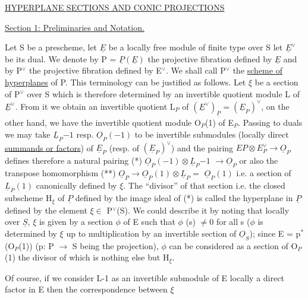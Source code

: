 \documentclass[11pt]{article}
\newcommand{\scanpage}[1]{\par\bigskip\noindent{\small\sffamily[scan #1]}\par}
\newcommand{\mspage}[1]{{\small\sffamily[p.\,#1]}}
\newcommand{\uline}[1]{\underline{#1}}
\begin{document}
\uline{HYPERPLANE SECTIONS AND CONIC PROJECTIONS}

\uline{Section 1: Preliminaries and Notation.}

Let S be a prescheme, let $\underline{E}$ be a locally free module of
finite type over S let $\underline{E}^{\vee}$ be its dual. We denote by P = $\underline{P}(\underline{E})$ the
projective fibration defined by $\underline{E}$ and by P$^{\vee}$ the projective
fibration defined by E$^{\vee}$. We shall call P$^{\vee}$ the \uline{scheme of}
\uline{hyperplanes} of P. This terminology can be justified as follows.
Let $\xi$ be a section of P$^{\vee}$ over S which is therefore determined by an
invertible quotient module L of $\underline{E}^{\vee}$. From it we obtain an
invertible quotient L$_{P}$ of $(\underline{E}^{\vee})_{\underline{P}} = (\underline{E}_{P})^{\vee}$, on the other hand, we have
the invertible quotient module O$_{P}$(1) of E$_{P}$. Passing to duals we
may take $\underline{L}_{P}{-1}$ resp. $\underline{O}_{P}(-1)$ to be invertible submodules (locally
direct \uline{summands or factors}) of $\underline{E}_{P}$ (resp. of $(\underline{E}_{P})^{\vee}$) and the pairing
$EP \otimes E^{\vee}_{P} \to \underline{O}_{P}$ defines therefore a natural pairing (*) $\underline{O}_{P}(-1) \otimes \underline{L}_{P}{-1}$
$\to \underline{O}_{P}$ or also the transpose homomorphism (**) $\underline{O}_{P} \to \underline{O}_{P}(1) \otimes \underline{L}_{P} =$
$\underline{O}_{P}(1)$ i.e. a section of $\underline{L}_{P}(1)$ canonically defined by $\xi$. The
``divisor'' of that section i.e. the closed subscheme H$_{\xi}$ of $\underline{P}$ defined
by the image ideal of (*) is called the hyperplane in $\underline{P}$ defined by
the element $\xi \in$ P$^{\vee}$(S). We could describe it by noting that locally
over $\underline{S}$, $\xi$ is given by a section $\phi$ of E such that $\phi$ (s) $\neq 0$ for all
s ($\phi$ is determined by $\xi$ up to multiplication by an invertible
section of $\underline{O}_{S}$); since E = p$^{*}$(O$_{P}$(1)) (p: P $\to$ S being the
projection), $\phi$ can be considered as a section of O$_{P}$(1) the divisor
of which is nothing else but H$_{\xi}$.

Of course, if we consider L-1 as an invertible submodule of E
locally a direct factor in E then the correspondence between $\xi$

\clearpage
\scanpage{24/5}
\mspage{5}
\end{document}
